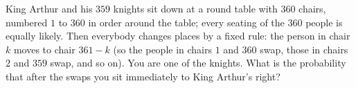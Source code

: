 King Arthur and his $359$ knights sit down at a round table with $360$ chairs, numbered $1$ to $360$ in order around the table; every seating of the $360$ people is equally likely. Then everybody changes places by a fixed rule: the person in chair $k$ moves to chair $361-k$ (so the people in chairs $1$ and $360$ swap, those in chairs $2$ and $359$ swap, and so on). You are one of the knights. What is the probability that after the swaps you sit immediately to King Arthur's right?
